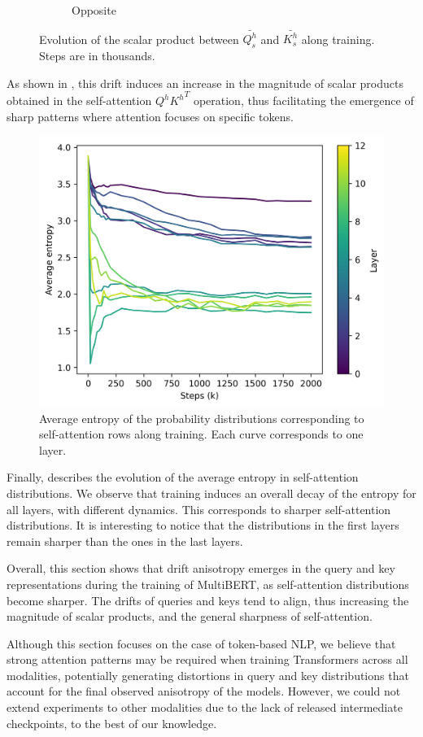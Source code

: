 \begin{figure}[ht]
\begin{subfigure}[b]{0.43\columnwidth}
         \caption{Opposite}
         \label{fig:scalar_opp}
    \end{subfigure}
    \caption{Evolution of the scalar product between $\bar{Q^h_s}$ and $\bar{K^h_s}$ along training. Steps are in thousands.}
    \label{fig:scalar_QK}
\end{figure}

As shown in , this drift induces an increase in the magnitude of scalar products obtained in the self-attention $Q^h{K^h}^T$ operation, thus facilitating the emergence of sharp patterns where attention focuses on specific tokens.

\begin{figure}[ht]
    \centering
    \includegraphics[width=0.6\linewidth]{sources/part_1/anisotropy/imgs/entropy_decay.png}
    \caption{Average entropy of the probability distributions corresponding to self-attention rows along training. Each curve corresponds to one layer.}
    \label{fig:entropy_decay}
\end{figure}

Finally,  describes the evolution of the average entropy in self-attention distributions. We observe that training induces an overall decay of the entropy for all layers, with different dynamics. This corresponds to sharper self-attention distributions. It is interesting to notice that the distributions in the first layers remain sharper than the ones in the last layers.

Overall, this section shows that drift anisotropy emerges in the query and key representations during the training of MultiBERT, as self-attention distributions become sharper. The drifts of queries and keys tend to align, thus increasing the magnitude of scalar products, and the general sharpness of self-attention.

Although this section focuses on the case of token-based NLP, we believe that strong attention patterns may be required when training Transformers across all modalities, potentially generating distortions in query and key distributions that account for the final observed anisotropy of the models. However, we could not extend experiments to other modalities due to the lack of released intermediate checkpoints, to the best of our knowledge.

